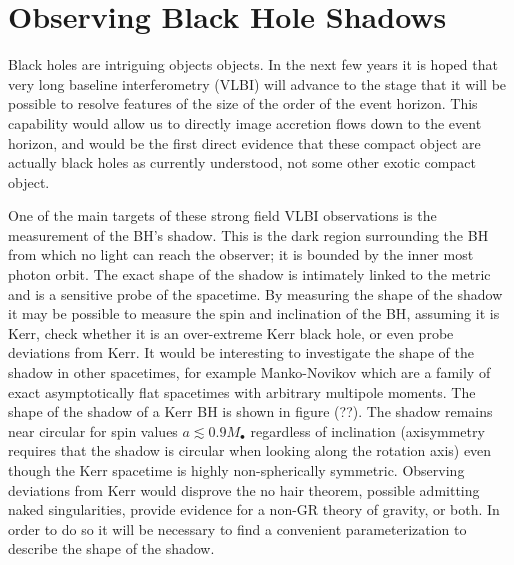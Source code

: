 \section{Observing Black Hole Shadows}

Black holes are intriguing objects objects. In the next few years it is hoped that very long baseline interferometry (VLBI) will advance to the stage that it will be possible to resolve features of the size of the order of the event horizon\cite{Doeleman2008}. This capability would allow us to directly image accretion flows down to the event horizon, and would be the first direct evidence that these compact object are actually black holes as currently understood, not some other exotic compact object.

One of the main targets of these strong field VLBI observations is the measurement of the BH's shadow. This is the dark region surrounding the BH from which no light can reach the observer; it is bounded by the inner most photon orbit\cite{Chandrasekhar1998}. The exact shape of the shadow is intimately linked to the metric and is a sensitive probe of the spacetime. By measuring the shape of the shadow it may be possible to measure the spin and inclination of the BH\cite{Hioki2009a}, assuming it is Kerr, check whether it is an over-extreme Kerr black hole\cite{Bambi2009}, or even probe deviations from Kerr\cite{Johannsen2010a, Johannsen2010b}. It would be interesting to investigate the shape of the shadow in other spacetimes, for example Manko-Novikov\cite{Manko1992, Gair2008a} which are a family of exact asymptotically flat spacetimes with arbitrary multipole moments. The shape of the shadow of a Kerr BH is shown in figure (??). The shadow remains near circular for spin values $a \lesssim 0.9 M_\bullet$ regardless of inclination (axisymmetry requires that the shadow is circular when looking along the rotation axis) even though the Kerr spacetime is highly non-spherically symmetric\cite{Johannsen2010b}. Observing deviations from Kerr would disprove the no hair theorem, possible admitting naked singularities, provide evidence for a non-GR theory of gravity, or both. In order to do so it will be necessary to find a convenient parameterization to describe the shape of the shadow.
